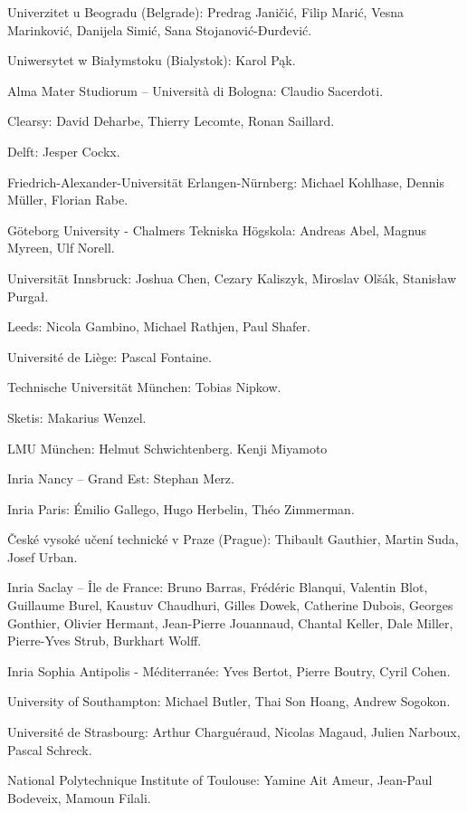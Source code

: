 Univerzitet u Beogradu (Belgrade): Predrag Janičić, Filip Marić, Vesna Marinković, Danijela Simić, Sana Stojanović-Đurđević.

Uniwersytet w Białymstoku (Bialystok): Karol Pąk.

Alma Mater Studiorum – Università di Bologna: Claudio Sacerdoti.

Clearsy: David Deharbe, Thierry Lecomte, Ronan Saillard.

Delft: Jesper Cockx.

Friedrich-Alexander-Universität Erlangen-Nürnberg: Michael Kohlhase, Dennis Müller, Florian Rabe.

G\"oteborg University - Chalmers Tekniska H\"ogskola: Andreas Abel, Magnus Myreen, Ulf Norell.

Universität Innsbruck: Joshua Chen, Cezary Kaliszyk, Miroslav Olšák, Stanisław Purgał.

Leeds: Nicola Gambino, Michael Rathjen, Paul Shafer.

Université de Liège: Pascal Fontaine.

Technische Universität München: Tobias Nipkow.

Sketis: Makarius Wenzel.

LMU München: Helmut Schwichtenberg. Kenji Miyamoto 

Inria Nancy – Grand Est: Stephan Merz.

Inria Paris: Émilio Gallego, Hugo Herbelin, Théo Zimmerman.

České vysoké učení technické v Praze (Prague): Thibault Gauthier, Martin Suda, Josef Urban.

Inria Saclay – Île de France: Bruno Barras, Frédéric Blanqui, Valentin Blot, Guillaume Burel, Kaustuv Chaudhuri, Gilles Dowek, Catherine Dubois, Georges Gonthier, Olivier Hermant, Jean-Pierre Jouannaud, Chantal Keller, Dale Miller, Pierre-Yves Strub, Burkhart Wolff.

Inria Sophia Antipolis - Méditerranée: Yves Bertot, Pierre Boutry, Cyril Cohen.

University of Southampton: Michael Butler, Thai Son Hoang, Andrew Sogokon.

Université de Strasbourg: Arthur Charguéraud, Nicolas Magaud, Julien Narboux, Pascal Schreck.

National Polytechnique Institute of Toulouse: Yamine Ait Ameur, Jean-Paul Bodeveix, Mamoun Filali. 


